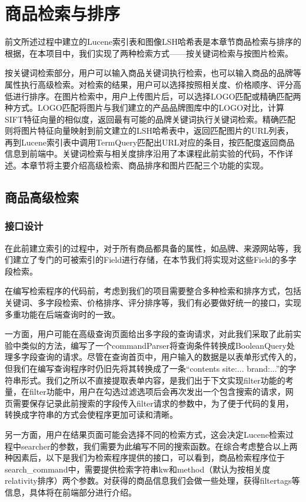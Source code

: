 
\chapter{商品检索与排序}

前文所述过程中建立的Lucene索引表和图像LSH哈希表是本章节商品检索与排序的根据，在本项目中，我们实现了两种检索方式——按关键词检索与按图片检索。

按关键词检索部分，用户可以输入商品关键词执行检索，也可以输入商品的品牌等属性执行高级检索。对检索的结果，用户可以选择按照相关度、价格顺序、评分高低进行排序。在图片检索中，用户上传图片后，可以选择LOGO匹配或精确匹配两种方式。LOGO匹配将图片与我们建立的产品品牌图库中的LOGO对比，计算SIFT特征向量的相似度，返回最有可能的品牌关键词执行关键词检索。精确匹配则将图片特征向量映射到前文建立的LSH哈希表中，返回匹配图片的URL列表，再到Lucene索引表中调用TermQuery匹配出URL对应的条目，按匹配度返回商品信息到前端中。关键词检索与相关度排序沿用了本课程此前实验的代码，不作详述。本章节将主要介绍高级检索、商品排序和图片匹配三个功能的实现。

\section{商品高级检索}


\subsection{接口设计}

在此前建立索引的过程中，对于所有商品都具备的属性，如品牌、来源网站等，我们建立了专门的可被索引的Field进行存储，在本节我们将实现对这些Field的多字段检索。

在编写检索程序的代码前，考虑到我们的项目需要整合多种检索和排序方式，包括关键词、多字段检索、价格排序、评分排序等，我们有必要做好统一的接口，实现多重功能在后端查询时的一致。

一方面，用户可能在高级查询页面给出多字段的查询请求，对此我们采取了此前实验中类似的方法，编写了一个commandParser将查询条件转换成BooleanQuery处理多字段查询的请求。尽管在查询首页中，用户输入的数据是以表单形式传入的，但我们在编写查询程序时仍旧先将其转换成了一条“contents site:... brand:...”的字符串形式。我们之所以不直接提取表单内容，是我们出于下文实现filter功能的考量，在filter功能中，用户在勾选过滤选项后会再次发出一个包含搜索的请求，网页需要保存记录此前搜索的字段传入filter请求的参数中，为了便于代码的复用，转换成字符串的方式会使程序更加可读和清晰。

另一方面，用户在结果页面可能会选择不同的检索方式，这会决定Lucene检索过程中searcher的参数，我们需要为此编写不同的搜索函数。在综合考虑整合以上两种因素后，以下是我们为检索程序提供的接口，可以看到，商品检索程序位于search\_command中，需要提供检索字符串kw和method（默认为按相关度relativity排序）两个参数。对获得的商品信息我们会做一些处理，获得filtertags等信息，具体将在前端部分进行介绍。

